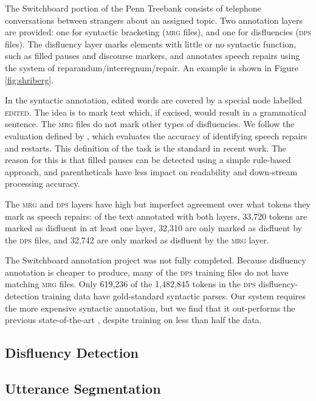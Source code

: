 \documentclass[11pt,letterpaper]{article}
\begin{document}
The Switchboard portion of the Penn Treebank \citep{marcus:93} consists of
telephone conversations between strangers about
an assigned topic.  Two annotation layers are provided: one for syntactic
bracketing (\textsc{mrg} files),
and one for disfluencies (\textsc{dps} files). 
The disfluency layer marks
elements with little or no syntactic function, such as filled pauses and discourse
markers, and annotates speech repairs using the \citet{shriberg:94} system of
reparandum/interregnum/repair. An example is shown in Figure \ref{fig:shriberg}.


In the syntactic annotation, edited words are covered by a special node labelled
\textsc{edited}.
The idea is to mark text which, if
excised, would result in a grammatical sentence.
The \textsc{mrg} files do not mark other types of disfluencies.
We follow the evaluation defined by \citet{Charniak01a}, which evaluates the
accuracy of identifying
speech repairs and restarts.  This definition of the task is the 
standard in recent work. The reason for this is that filled pauses can be
detected using a simple rule-based approach, and parentheticals have less impact
on readability and down-stream processing accuracy.

The \textsc{mrg} and \textsc{dps} layers have high but imperfect agreement over
what tokens they mark as speech repairs: of the text annotated with both layers,
33,720 tokens are marked as disfluent in at least one layer, 32,310 are only marked
as disfluent by the \textsc{dps} files, and 32,742 are only marked as disfluent
by the \textsc{mrg} layer.

The Switchboard annotation project was not fully completed.
Because disfluency annotation is cheaper to produce, many of the \textsc{dps}
training files do not have matching \textsc{mrg} files.
Only 619,236 of the 1,482,845 tokens
in the \textsc{dps} disfluency-detection training data have gold-standard syntactic
parses.  Our system requires the more expensive syntactic annotation,
but we find that it out-performs the previous state-of-the-art \citep{qian:13},
despite training on less than half the data.



\subsection{Disfluency Detection}

\subsection{Utterance Segmentation}
\end{document}
